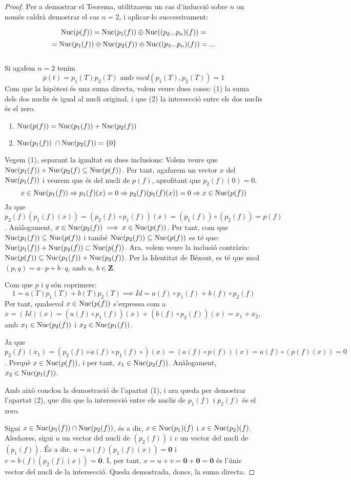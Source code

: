 \begin{proof}

Per a demostrar el Teorema, utilitzarem un cas d'inducció sobre $n$ on només caldrà demostrar el cas $n = 2$, i aplicar-lo successivament:

$$\operatorname{Nuc}(p(f)) = \operatorname{Nuc}(p_1(f)) \oplus \operatorname{Nuc}((p_2 ... p_n)(f)) =$$
$$= \operatorname{Nuc}(p_1(f)) \oplus \operatorname{Nuc}(p_2(f)) \oplus \operatorname{Nuc}((p_3 ... p_n)(f)) = ...$$\\
Si agafem $n=2$ tenim
$$p(t) = p_1(T) p_2(T)\text{ amb }mcd(p_1(T), p_2(T)) = 1$$
Com que la hipòtesi és una suma directa, volem veure dues coses: (1) la suma dels dos nuclis és igual al nucli original, i que (2) la intersecció entre els dos nuclis és el zero. 

\begin{enumerate}
    \item $\operatorname{Nuc}(p(f)) = \operatorname{Nuc}(p_1(f)) + \operatorname{Nuc}(p_2(f))$
    \item $\operatorname{Nuc}(p_1(f)) \; \cap \operatorname{Nuc}(p_2(f)) = \{0\}$
\end{enumerate}

Vegem (1), separant la igualtat en dues inclusions:
Volem veure que $\operatorname{Nuc}(p_1(f))+ \operatorname{Nuc}(p_2(f) \subseteq \operatorname{Nuc}(p(f))$. Per tant, agafarem un vector $x$ del $\operatorname{Nuc}(p_1(f))$ i veurem que és del nucli de $p(f)$, aprofitant que $p_2(f)(0) = 0$.
 \[
 x \in \operatorname{Nuc}(p_1(f)) \Rightarrow p_1(f)(x) = 0 \Rightarrow p_2(f)(p_1(f)(x)) = 0 \Rightarrow x \in \operatorname{Nuc}(p(f))
 \]
Ja que $p_2(f)(p_1(f)(x)) = (p_2(f) \circ p_1(f))(x) = (p_1(f)) \circ (p_2(f)) = p(f)$. Anàlogament, $x \in \operatorname{Nuc}(p_2(f)) \implies x \in \operatorname{Nuc}(p(f))$. Per tant, com que $\operatorname{Nuc}(p_1(f)) \subseteq \operatorname{Nuc}(p(f))$ i també $\operatorname{Nuc}(p_2(f)) \subseteq \operatorname{Nuc}(p(f))$ es té que: $\operatorname{Nuc}(p_1(f)) + \operatorname{Nuc}(p_2(f)) \subset \operatorname{Nuc}(p(f))$.
Ara, volem veure la inclusió contrària: $\operatorname{Nuc}(p(f)) \subseteq  \operatorname{Nuc}(p_1(f)) + \operatorname{Nuc}(p_2(f))$. Per la Identitat de Bézout, es té que mcd$(p, q) = a \cdot p + b \cdot q$, amb $a$, $b \in \mathbf{Z}$.

Com que $p$ i $q$ són coprimers:
$$1 = a(T)p_1(T) + b(T)p_2(T) \implies Id = a(f) \circ p_1(f) + b(f) \circ p_2(f)$$
Per tant, qualsevol $x \in \operatorname{Nuc}(p(f))$ s'expressa com a $x = (Id)(x) = (a(f)\circ p_1(f))(x) + (b(f)\circ p_2(f))(x) = x_1 + x_2$, amb $x_1 \in \operatorname{Nuc}(p_2(f))$ i $x_2 \in \operatorname{Nuc}(p_1(f))$.

Ja que $p_2(f)(x_1) = (p_2(f)\circ a(f)\circ p_1(f)\circ)(x) = (a(f)\circ p(f))(x) = a(f)\circ (p(f)(x)) = 0$. Perquè $x \in \operatorname{Nuc}(p(f))$, i per tant, $x_1 \in \operatorname{Nuc}(p_2(f))$. Anàlogament, $x_2 \in \operatorname{Nuc}(p_1(f))$.

Amb això conclou la demostració de l'apartat (1), i ara queda per demostrar l'apartat (2), que diu que la intersecció entre els nuclis de $p_1(f)$ i $p_2(f)$ és el zero.

Sigui $x \in \operatorname{Nuc}(p_1(f)) \cap \operatorname{Nuc}(p_2(f))$, és a dir, $x \in \operatorname{Nuc}(p_1)(f)$ i $x \in \operatorname{Nuc}(p_2)(f)$. Aleshores, sigui $u$ un vector del nucli de $(p_2(f))$ i $v$ un vector del nucli de $(p_1(f))$. És a dir, ${u} = a(f)(p_1(f)(x)) = \mathbf{0}$ i ${v} = b(f)(p_2(f)(x)) = \mathbf{0}$. I, per tant, ${x} = {u} + {v} = \mathbf{0} + \mathbf{0} = \mathbf{0}$ és l'únic vector del nucli de la intersecció.
Queda demostrada, doncs, la suma directa.
\end{proof}
